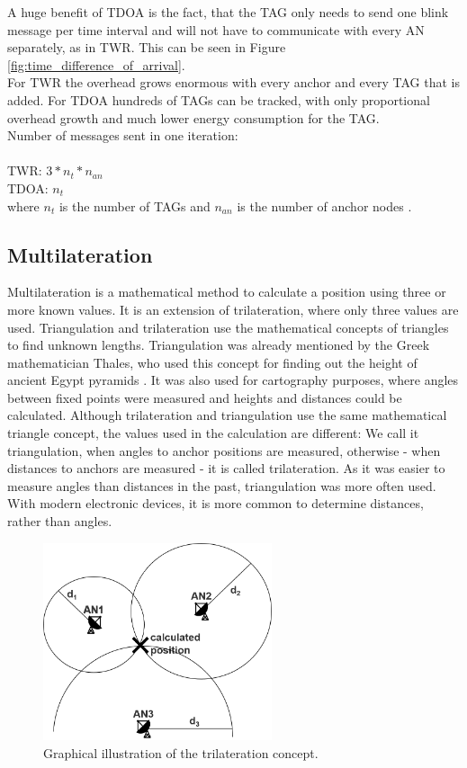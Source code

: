 A huge benefit of TDOA is the fact, that the TAG only needs to send one blink message per time interval and will not have to communicate with every AN separately, as in TWR. This can be seen in Figure \ref{fig:time_difference_of_arrival}.\\
\noindent\hspace*{5mm}%
For TWR the overhead grows enormous with every anchor and every TAG that is added. For TDOA hundreds of TAGs can be tracked, with only proportional overhead growth and much lower energy consumption for the TAG.\\
Number of messages sent in one iteration:\\
\\
TWR:  $3 * n_{t} * n_{an}$\\
TDOA:  $n_{t}$\\
where $n_{t}$ is the number of TAGs and $n_{an}$ is the number of anchor nodes \cite{SewioTDOA}.

\subsection{Multilateration}
Multilateration is a mathematical method to calculate a position using three or more known values. It is an extension of trilateration, where only three values are used. Triangulation and trilateration use the mathematical concepts of triangles to find unknown lengths. Triangulation was already mentioned by the Greek mathematician Thales, who used this concept for finding out the height of ancient Egypt pyramids \cite{thales}. It was also used for cartography purposes, where angles between fixed points were measured and heights and distances could be calculated. 
Although trilateration and triangulation use the same mathematical triangle concept, the values used in the calculation are different: We call it triangulation, when angles to anchor positions are measured, otherwise - when distances to anchors are measured - it is called trilateration.
As it was easier to measure angles than distances in the past, triangulation was more often used. With modern electronic devices, it is more common to determine distances, rather than angles. 

\begin{figure}[th]
\centering
\includegraphics[width=0.6\textwidth]{Figures/trilateration}
\decoRule
\caption[Trilateration]{Graphical illustration of the trilateration concept.}
\label{fig:trilateration}
\end{figure}

